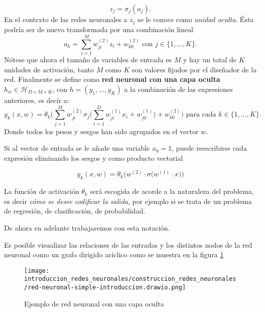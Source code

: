 \begin{equation}
    z_j = \sigma_j(a_j).
\end{equation}
En el contexto de las redes neuronales a $z_j$ se le conoce como \textit{unidad oculta}. Ésta  podría ser de 
nuevo  transformada por una combinación lineal 
\begin{equation}
    a_k = \sum_{i=1}^M w_{ji}^{(2)} z_i + w_{k0}^{(2)}
    \text{ con } j \in \{1, \ldots, K \}.
\end{equation}
Nótese que ahora el tamaño de variables de entrada es $M$
y hay un total de $K$ unidades de activación, tanto $M$ como $K$ son
valores fijados por el diseñador de la red. 
Finalmente se define como \textbf{red neuronal con una capa oculta} $h_w \in \mathcal{H}_{D \times M \times K}$, con $h=(y_1, \ldots, y_K)$ a la combinación de las expresiones anteriores, es decir a: 
\begin{equation}
    y_k(x,w) = \theta_k 
    \biggl( 
        \sum^M_{j=1} w_{ji}^{(2)}
        \sigma_j 
        \biggl(
            \sum_{i=1}^D w_{ji}^{(1)} x_i + w_{j0}^{(1)}
        \biggr)
        + w_{k0}^{(2)}
    \biggr) 
    \text{ para cada  } k \in \{1, \ldots, K \}.
\end{equation}
Donde todos los pesos y sesgos han sido agrupados en el vector $w$. 

Si al vector de entrada se le añade una variable $x_0 = 1$, puede reescribirse cada expresión eliminando los sesgos y como producto vectorial

\begin{equation}
    y_k(x,w) = \theta_k 
    \bigl(
         w^{(2)} \cdot
        \sigma    
        \bigl(
             w^{(1)} \cdot x 
        \bigr)
    \bigr)
\end{equation}  

La función de activación $\theta_k$ será escogida de acorde a la
naturaleza del problema, es decir \textit{cómo se desee codificar la salida}, por ejemplo si se trata de un problema de regresión, de clasificación, de probabilidad. 
 
De ahora en adelante trabajaremos con esta notación. 

Es posible visualizar las relaciones de las entradas y los distintos nodos de la 
red neuronal como un grafo dirigido acíclico como se muestra en la figura \ref{img:ejemplo topología red neuronal}

\begin{figure}[h!] 
    \centering
    \texttt{[image: introduccion\_redes\_neuronales/construccion\_redes\_neuronales/red-neuronal-simple-introduccion.drawio.png]}
    \caption{Ejemplo de red neuronal con una capa oculta}
    \label{img:ejemplo topología red neuronal}
\end{figure} 
 

